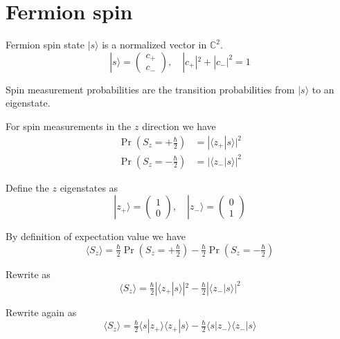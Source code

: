 


\section*{Fermion spin}

Fermion spin state $|s\rangle$ is a normalized vector in $\mathbb C^2$.
\begin{equation*}
|s\rangle=\begin{pmatrix}c_+\\c_-\end{pmatrix},\quad|c_+|^2+|c_-|^2=1
\end{equation*}

Spin measurement probabilities are the transition probabilities from $|s\rangle$ to an eigenstate.

\bigskip
For spin measurements in the $z$ direction we have
\begin{align*}
\Pr\left(S_z=+\tfrac{\hbar}{2}\right)&=|\langle z_+|s\rangle|^2
\\
\Pr\left(S_z=-\tfrac{\hbar}{2}\right)&=|\langle z_-|s\rangle|^2
\end{align*}

Define the $z$ eigenstates as
\begin{equation*}
|z_+\rangle=\begin{pmatrix}1\\0\end{pmatrix},\quad
|z_-\rangle=\begin{pmatrix}0\\1\end{pmatrix}
\end{equation*}

By definition of expectation value we have
\begin{equation*}
\langle S_z\rangle
=\tfrac{\hbar}{2}\Pr\left(S_z=+\tfrac{\hbar}{2}\right)
-\tfrac{\hbar}{2}\Pr\left(S_z=-\tfrac{\hbar}{2}\right)
\end{equation*}

Rewrite as
\begin{equation*}
\langle S_z\rangle=\tfrac{\hbar}{2}|\langle z_+|s\rangle|^2-\tfrac{\hbar}{2}|\langle z_-|s\rangle|^2
\end{equation*}

Rewrite again as
\begin{equation*}
\langle S_z\rangle
=\tfrac{\hbar}{2}\langle s|z_+\rangle\langle z_+|s\rangle
-\tfrac{\hbar}{2}\langle s|z_-\rangle\langle z_-|s\rangle
\end{equation*}

